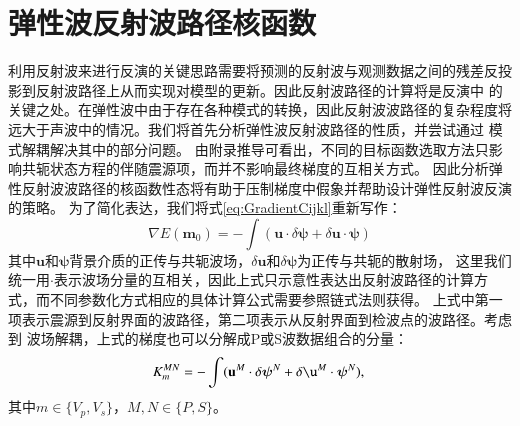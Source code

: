 \section{弹性波反射波路径核函数}
利用反射波来进行反演的关键思路需要将预测的反射波与观测数据之间的残差反投影到反射波路径上从而实现对模型的更新。因此反射波路径的计算将是反演中
的关键之处。在弹性波中由于存在各种模式的转换，因此反射波波路径的复杂程度将远大于声波中的情况。我们将首先分析弹性波反射波路径的性质，并尝试通过
模式解耦解决其中的部分问题。
由附录推导可看出，不同的目标函数选取方法只影响共轭状态方程的伴随震源项，而并不影响最终梯度的互相关方式。
因此分析弹性反射波波路径的核函数性态将有助于压制梯度中假象并帮助设计弹性反射波反演的策略。
为了简化表达，我们将式\ref{eq:GradientCijkl}重新写作：
\begin{equation}
    \nabla E(
    \mathbf{m}_0)=-\int(
    \mathbf{u}\cdot\delta \boldsymbol{\psi}
    +\delta
    \mathbf{u}\cdot{\boldsymbol{\psi}})
    \label{eq:kernelgradient} 
\end{equation} 
其中$\mathbf{u}$和$\boldsymbol{\psi}$背景介质的正传与共轭波场，$\delta\mathbf{u}$和$\delta \boldsymbol{\psi}$为正传与共轭的散射场，
这里我们统一用$\cdot$表示波场分量的互相关，因此上式只示意性表达出反射波路径的计算方式，而不同参数化方式相应的具体计算公式需要参照链式法则获得。
上式中第一项表示震源到反射界面的波路径，第二项表示从反射界面到检波点的波路径。考虑到
波场解耦，上式的梯度也可以分解成P或S波数据组合的分量：
\begin{equation}
    K_m^{MN}     
    =-\int(\mathbf{u}^M\cdot\delta \boldsymbol{\psi}^N
    +\delta
    \mathbf{\u}^M\cdot\boldsymbol{\psi}^N),\\
    \label{eq:decompkernel} 
\end{equation}
其中$m\in\{V_p, V_s\}$，$M,N\in\{P,S\}$。

